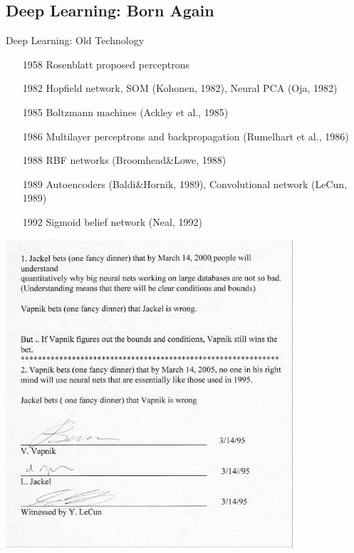 \documentclass{beamer}
\begin{document}
\subsection{Deep Learning: Born Again}

\begin{frame}{Deep Learning: Old Technology}

\begin{enumerate}
\item[1958] Rosenblatt proposed perceptrons 
\item[1982] Hopfield network, SOM {\scriptsize (Kohonen, 1982)}, Neural PCA {\scriptsize (Oja, 1982)}
\item[1985] Boltzmann machines {\scriptsize (Ackley et al., 1985)}
\item[1986] Multilayer perceptrons and backpropagation {\scriptsize (Rumelhart et al., 1986)}
\item[1988] RBF networks {\scriptsize (Broomhead\&Lowe, 1988)}
\item[1989] Autoencoders {\scriptsize (Baldi\&Hornik, 1989)}, Convolutional network {\scriptsize (LeCun, 1989)}
\item[1992] Sigmoid belief network {\scriptsize (Neal, 1992)}
\end{enumerate}

\end{frame}

\begin{frame}

\centering
\includegraphics[width=0.80\textwidth]{bet-by-2000.jpg}

\end{frame}
\end{document}
